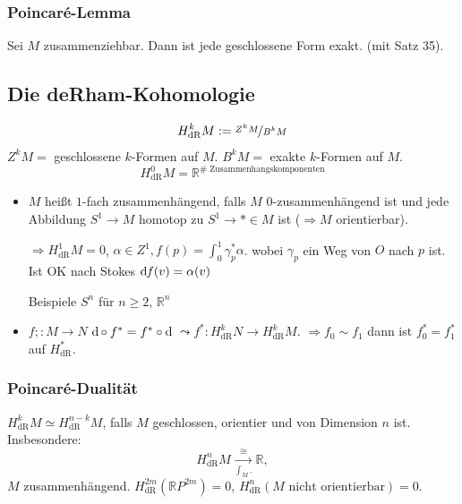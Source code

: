 \subsubsection{Poincaré-Lemma} %
\label{ssub:632}
Sei $M$ zusammenziehbar. Dann ist jede geschlossene Form exakt.
(mit Satz 35).

\subsection{Die deRham-Kohomologie} %
\label{sub:64}
\[
	H_{\text{dR}}^k M := \nicefrac{Z^k M}{B^k M}
\]
$Z^k M =$ geschlossene $k$-Formen auf $M$. $B^k M =$ exakte $k$-Formen auf $M$.
\[
	H_{\text{dR}}^0 M = \mathds{R}^{\# \text{ Zusammenhangskomponenten}}
\]
\begin{itemize}
	\item $M$ heißt $1$-fach zusammenhängend, falls $M$ $0$-zusammenhängend ist und jede Abbildung $S^1 \to M$ homotop zu $S^1 \to * \in M$ ist ($\Rightarrow M$ 
	orientierbar).
	
	$\Rightarrow H_{\text{dR}}^1 M = 0$, $\alpha \in Z^1, f(p) = \int_{0} ^{1} \! \gamma_p^* \alpha$. wobei $\gamma_p$ ein Weg von $O$ nach $p$ ist. Ist OK nach Stokes
	$\mathrm{d}\mkern-1.0mu f (v) = \alpha(v)$
	
	Beispiele $S^n$ für $n\ge 2$, $\mathds{R}^n$
	\item $f ;: M \to N$ $\mathrm{d}\mkern-1.0mu \circ f^* = f^* \circ \mathrm{d}\mkern-1.0mu$ $\leadsto f^* : H_{\text{dR}}^k N \to H_{\text{dR}}^k M$. $\Rightarrow f_0 \sim f_1$ dann ist $f_0^* = f_1^*$
	auf $H_{\text{dR}}^*$.
\end{itemize}

\subsubsection{Poincaré-Dualität} %
\label{ssub:634}
$H_{\text{dR}}^k M \simeq H_{\text{dR}}^{n-k} M$, falls $M$ geschlossen, orientier und von Dimension $n$ ist.
Insbesondere: 
\[
	H_{\text{dR}}^n M \xrightarrow[\int_M .]{\enspace\cong \enspace} \mathds{R}, 
\]
$M$ zusammenhängend. $H_{\text{dR}}^{2m}(\mathds{R}P^{2m}) = 0$, $H_{\text{dR}}^n (M \text{ nicht orientierbar})=0$.
\cleardoubleoddemptypage
{}
\setcounter{page}{1}
\printindex
\listoffigures
\todototoc
{}

